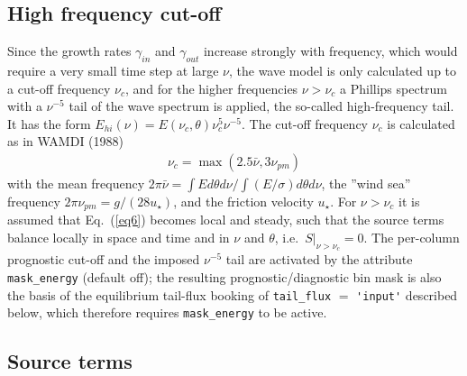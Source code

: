\documentclass[12pt]{article}
\newcommand{\beq}  { \begin{eqnarray} }
\newcommand{\eeq}  { \end{eqnarray}}
\newcommand{\eq }  [1]{Eq.~(\ref{#1})}  %
\begin{document}
\fi
\subsection*{High frequency cut-off}

Since the growth rates $\gamma_{in}$ and $\gamma_{out}$ increase strongly with frequency,
which would require a very small time step at large $\nu$,
the wave model is only calculated up to  a cut-off frequency $\nu_c$,
and for the higher frequencies $\nu > \nu_c$ 
a Phillips spectrum with a $\nu^{-5}$ tail of the wave
spectrum is  applied, the so-called high-frequency tail. It has the form 
$E_{hi}(\nu)  =   E(\nu_c,\theta) \nu_c^5 \nu^{-5}$. 
The cut-off frequency $\nu_c$ is calculated as in WAMDI (1988) 
\beq
\nu_c = \max( 2.5 \bar \nu, 3 \nu_{pm})
\eeq
with the mean frequency 
$2 \pi \bar \nu =  \int E d \theta d\nu/ \int (E/\sigma) d \theta d\nu$, the ''wind sea'' frequency $2 \pi \nu_{pm} =  g/(28 u_{\star})$,
and the friction velocity $u_\star$.
For $\nu > \nu_c$ it is assumed that \eq{eq6} becomes local and steady, such that the
source terms balance locally in space and time and in $\nu$ and $\theta$, i.e.\ $S |_{\nu>\nu_c}=0$.
The per-column prognostic cut-off and the imposed $\nu^{-5}$ tail are activated by the
attribute \verb|mask_energy| (default off); the resulting prognostic/diagnostic bin mask
is also the basis of the equilibrium tail-flux booking of \verb|tail_flux| $=$ \verb|'input'|
described below, which therefore requires \verb|mask_energy| to be active.


\subsection*{Source terms}
\end{document}
